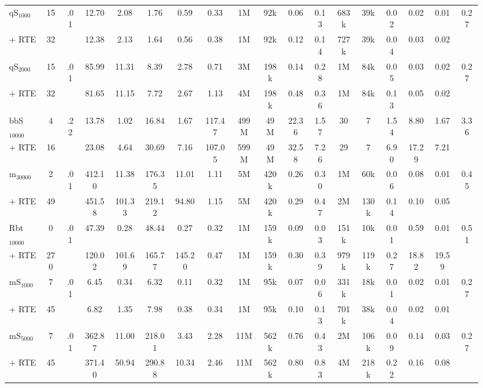 \begin{landscape}
\begin{figure}[h]
\begin{tabular}{|l|c|c|c|c|c|c|c|c|c|c|c|c|c|c|c|c|c|}
    \hline
    qS$_{1000}$ &15 &\multirow{2}{*}{.01} &12.70 &2.08 &1.76 &0.59 &0.33 &1M &92k &0.06 &0.13 &683k &39k &0.02 &0.02 &0.01 &\multirow{2}{*}{0.27}\\
+ RTE &32 &&12.38 &2.13 &1.64 &0.56 &0.38 &1M &92k &0.12 &0.14 &727k &39k &0.04 &0.03 &0.02 &\\

    \hline
    qS$_{2000}$ &15 &\multirow{2}{*}{.01} &85.99 &11.31 &8.39 &2.78 &0.71 &3M &198k &0.14 &0.28 &1M &84k &0.05 &0.03 &0.02 &\multirow{2}{*}{0.27}\\
+ RTE &32 &&81.65 &11.15 &7.72 &2.67 &1.13 &4M &198k &0.48 &0.36 &1M &84k &0.13 &0.05 &0.02 &\\
    \hline
    bbS$_{10000}$ &4 &\multirow{2}{*}{.22} &13.78 &1.02 &16.84 &1.67 &117.47 &499M &49M &22.36 &1.57 &30 &7 &1.54 &8.80 &1.67 &\multirow{2}{*}{3.36}\\
+ RTE &16 &&23.08 &4.64 &30.69 &7.16 &107.05 &599M &49M &32.58 &7.26 &29 &7 &6.90 &17.29 &7.21 &\\
    \hline
    m$_{30000}$ &2 &\multirow{2}{*}{.01} &412.10 &11.38 &176.35 &11.01 &1.11 &5M &420k &0.26 &0.30 &1M &60k &0.06 &0.08 &0.01 &\multirow{2}{*}{0.45}\\
+ RTE &49 &&451.58 &101.33 &219.12 &94.80 &1.15 &5M &420k &0.29 &0.47 &2M &130k &0.14 &0.10 &0.05 &\\

    \hline
    Rbt$_{10000}$ &0 &\multirow{2}{*}{.01} &47.39 &0.28 &48.44 &0.27 &0.32 &1M &159k &0.09 &0.03 &151k &10k &0.01 &0.59 &0.01 &\multirow{2}{*}{0.51}\\
+ RTE &270 &&120.02 &101.69 &165.77 &145.20 &0.47 &1M &159k &0.30 &0.39 &979k &119k &0.27 &18.82 &19.59 &\\
    \hline
mS$_{1000}$ &7 &\multirow{2}{*}{.01} &6.45 &0.34 &6.32 &0.11 &0.32 &1M &95k &0.07 &0.06 &331k &18k &0.01 &0.02 &0.01 &\multirow{2}{*}{0.27}\\
+ RTE &45 &&6.82 &1.35 &7.98 &0.38 &0.34 &1M &95k &0.10 &0.13 &701k &38k &0.04 &0.02 &0.01 &\\
        \hline
mS$_{5000}$ &7 &\multirow{2}{*}{.01} &362.87 &11.00 &218.01 &3.43 &2.28 &11M &562k &0.76 &0.43 &2M &106k &0.09 &0.14 &0.03 &\multirow{2}{*}{0.27}\\
+ RTE &45 &&371.40 &50.94 &290.88 &10.34 &2.46 &11M &562k &0.80 &0.83 &4M &218k &0.22 &0.16 &0.08 &\\


\end{tabular}
\end{figure}
\end{landscape}

